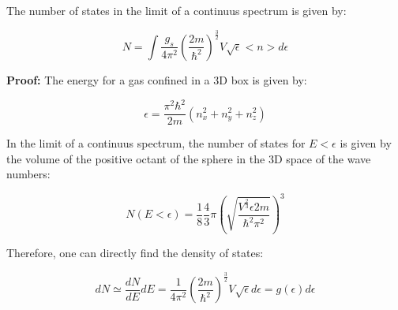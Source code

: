 \documentclass{article}
\begin{document}
\begin{tcolorbox}[colframe=gray!50, colback=gray!10, coltitle=black, title=Number of states]
    The number of states in the limit of a continuus spectrum is given by:

    \begin{equation}
        N=\int \frac{g_s}{4\pi^2}\left( \frac{2m}{\hbar^2} \right)^{\frac{3}{2}}V\sqrt{\epsilon} <n>d\epsilon
    \end{equation}
\end{tcolorbox}

\textbf{Proof:}
The energy for a gas confined in a 3D box is given by:

\begin{equation}
    \epsilon=\frac{\pi^2\hbar^2}{2m}(n_x^2+n_y^2+n_z^2)
\end{equation}

In the limit of a continuus spectrum, the number of states for $E<\epsilon$ is given by the volume of the
positive octant of the sphere in the 3D space of the wave numbers:

\begin{equation}
    N(E<\epsilon)= \frac{1}{8} \frac{4}{3}\pi \left(\sqrt{\frac{V^\frac{2}{3} \epsilon 2m}{\hbar^2\pi^2}}\right)^3
\end{equation}

Therefore, one can directly find the density of states:

\begin{equation}
    dN\simeq\frac{dN}{dE}dE=\frac{1}{4\pi^2}\left(\frac{2m}{\hbar^2}\right)^{\frac{3}{2}}V\sqrt{\epsilon}d\epsilon=g(\epsilon)d\epsilon
\end{equation}
\end{document}
